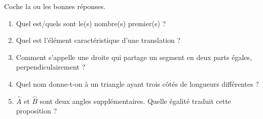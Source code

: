 %
%
    Coche la ou les bonnes réponses.
    \begin{enumerate}
        \item Quel est/quels sont le(s) nombre(s) premier(s) ?
        \item Quel est l'élément caractéristique d'une translation ?
        \item Comment s'appelle une droite qui partage un segment en deux parts égales, perpendiculairement ?
        \item Quel nom donne-t-on à un triangle ayant trois côtés de longueurs différentes ?
              \newpage
        \item \(\widehat{A}\) et \(\widehat{B}\) sont deux angles supplémentaires. Quelle égalité traduit cette proposition ?

\end{enumerate}
